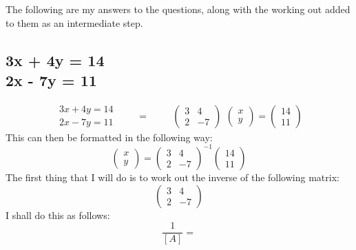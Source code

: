 \documentclass[a4paper,10pt]{article}
\begin{document}
      The following are my answers to the questions, along with the working out added to them as an intermediate step.

      \subsection{3x + 4y = 14\\2x - 7y = 11}
      \[
        \begin{split}
          3x + 4y = 14\\2x - 7y = 11
        \end{split}
        \qquad
        =
        \qquad
        \begin{split}
          \begin{pmatrix}
            3 & 4\\2 & -7
          \end{pmatrix}
        \end{split}
        \begin{pmatrix}
          x\\y
        \end{pmatrix}
        =
        \begin{pmatrix}
          14\\11
        \end{pmatrix}
      \]
      This can then be formatted in the following way:
      \begin{equation*}
        \begin{pmatrix}
          x\\y
        \end{pmatrix}
        =
        \begin{pmatrix}
          3 & 4\\2 & -7
        \end{pmatrix}
        ^{-1}
        \begin{pmatrix}
          14\\11
        \end{pmatrix}
      \end{equation*}
	    The first thing that I will do is to work out the inverse of the following matrix:
      \begin{equation*}
	       \begin{pmatrix}
           3 & 4\\2 & -7
	       \end{pmatrix}
      \end{equation*}
      I shall do this as follows:
      \begin{equation*}
        \frac{1}{[A]}
        =
      \end{equation*}
\end{document}
